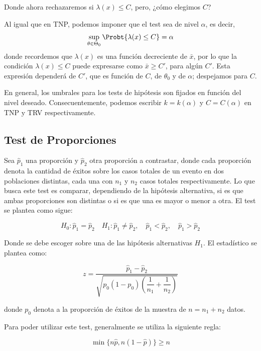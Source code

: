 \begin{example}
Donde ahora rechazaremos si $\lambda(x)\leq C$, pero, ¿cómo elegimos $C$?

Al igual que en TNP, podemos imponer que el test sea de nivel $\alpha$, es decir, 
\begin{equation}
 	\sup_{\theta\in\Theta_0} \Probt{\lambda(x)\leq C} = \alpha
 \end{equation} 
 donde recordemos que $\lambda(x)$ es una función decreciente de $\bar{x}$, por lo que la condición $\lambda(x)\leq C$ puede expresarse como $\bar{x}\geq C'$, para algún $C'$. Esta expresión dependerá de $C'$, que es función de $C$, de $\theta_0$ y de $\alpha$; despejamos para $C$.
 
 \end{example} 
 
 \begin{remark}
     En general, los umbrales para los tests de hipótesis son fijados en función del nivel deseado. Consecuentemente, podemos escribir $k=k(\alpha)$ y $C=C(\alpha)$ en TNP y TRV respectivamente. 
 \end{remark}
 
\subsection{Test de Proporciones}

Sea $\hat{p}_1$ una proporción y $\hat{p}_2$ otra proporción a contrastar, donde cada proporción denota la cantidad de éxitos sobre los casos totales de un evento en dos poblaciones distintas, cada una con $n_1$ y $n_2$ casos totales respectivamente. Lo que busca este test es comparar, dependiendo de la hipótesis alternativa, si es que ambas proporciones son distintas o si es que una es mayor o menor a otra. El test se plantea como sigue:

$$
H_0:\hat{p}_1=\hat{p}_2 \quad H_1:\hat{p}_1\neq \hat{p}_2,\quad \hat{p}_1<\hat{p}_2,\quad \hat{p}_1>\hat{p}_2 
$$

Donde se debe escoger sobre una de las hipótesis alternativas $H_1$. El estadístico se plantea como:

$$
z = \dfrac{\hat{p}_1-\hat{p}_2}{\sqrt{p_0(1-p_0)\left ( \dfrac{1}{n_1}+\dfrac{1}{n_2}\right)}}
$$

donde $p_0$ denota a la proporción de éxitos de la muestra de $n=n_1+n_2$ datos.

Para poder utilizar este test, generalmente se utiliza la siguiente regla:

$$
\min{\{n\hat{p}, n(1-\hat{p})\}}\geq n
$$

